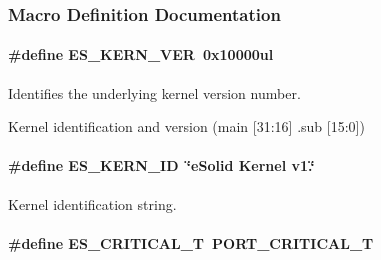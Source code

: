 \subsubsection{Macro Definition Documentation}
\hypertarget{group__kern__intf_gacde22f7336a3c1c032dfc0ee3b94f506}{
\paragraph[{E\-S\-\_\-\-K\-E\-R\-N\-\_\-\-V\-E\-R}]{\setlength{\rightskip}{0pt plus 5cm}\#define E\-S\-\_\-\-K\-E\-R\-N\-\_\-\-V\-E\-R~0x10000ul}}\label{group__kern__intf_gacde22f7336a3c1c032dfc0ee3b94f506}


Identifies the underlying kernel version number. 

Kernel identification and version (main \mbox{[}31\-:16\mbox{]} .sub \mbox{[}15\-:0\mbox{]}) \hypertarget{group__kern__intf_ga7a9484c6b09349e4eb82ba67c0989e25}{
\paragraph[{E\-S\-\_\-\-K\-E\-R\-N\-\_\-\-I\-D}]{\setlength{\rightskip}{0pt plus 5cm}\#define E\-S\-\_\-\-K\-E\-R\-N\-\_\-\-I\-D~\char`\"{}e\-Solid Kernel v1.\char`\"{}}}\label{group__kern__intf_ga7a9484c6b09349e4eb82ba67c0989e25}


Kernel identification string. 

\hypertarget{group__kern__intf_ga0420d9c03ac590d6e3e46fd17f6a739e}{
\paragraph[{E\-S\-\_\-\-C\-R\-I\-T\-I\-C\-A\-L\-\_\-\-T}]{\setlength{\rightskip}{0pt plus 5cm}\#define E\-S\-\_\-\-C\-R\-I\-T\-I\-C\-A\-L\-\_\-\-T~P\-O\-R\-T\-\_\-\-C\-R\-I\-T\-I\-C\-A\-L\-\_\-\-T}}\label{group__kern__intf_ga0420d9c03ac590d6e3e46fd17f6a739e}


